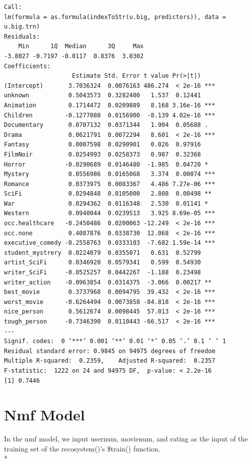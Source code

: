 \documentclass[11pt]{article}
\newcommand\tab[1][0.5cm]{\hspace*{#1}}
\begin{document}
\begin{verbatim}
Call:
lm(formula = as.formula(indexToStr(u.big, predictors)), data = u.big.trn)
Residuals:
    Min      1Q  Median      3Q     Max 
-3.8027 -0.7197 -0.0117  0.8376  3.0302 
Coefficients:
                   Estimate Std. Error t value Pr(>|t|)    
(Intercept)       3.7036324  0.0076163 486.274  < 2e-16 ***
unknown           0.5043573  0.3282400   1.537  0.12441    
Animation         0.1714472  0.0209889   8.168 3.16e-16 ***
Children         -0.1277080  0.0156900  -8.139 4.02e-16 ***
Documentary       0.0707132  0.0371344   1.904  0.05688 .  
Drama             0.0621791  0.0072294   8.601  < 2e-16 ***
Fantasy           0.0007598  0.0290901   0.026  0.97916    
FilmNoir          0.0254993  0.0258373   0.987  0.32368    
Horror           -0.0290689  0.0146480  -1.985  0.04720 *  
Mystery           0.0556986  0.0165068   3.374  0.00074 ***
Romance           0.0373975  0.0083367   4.486 7.27e-06 ***
SciFi             0.0294848  0.0105000   2.808  0.00498 ** 
War               0.0294362  0.0116348   2.530  0.01141 *  
Western           0.0940044  0.0239513   3.925 8.69e-05 ***
occ.healthcare   -0.2450486  0.0200063 -12.249  < 2e-16 ***
occ.none          0.4087876  0.0338730  12.068  < 2e-16 ***
executive_comedy -0.2558763  0.0333103  -7.682 1.59e-14 ***
student_mystrery  0.0224079  0.0355071   0.631  0.52799    
artist_SciFi      0.0346920  0.0579341   0.599  0.54930    
writer_SciFi     -0.0525257  0.0442267  -1.188  0.23498    
writer_action    -0.0963854  0.0314375  -3.066  0.00217 ** 
best_movie        0.3737968  0.0094795  39.432  < 2e-16 ***
worst_movie      -0.6264494  0.0073858 -84.818  < 2e-16 ***
nice_person       0.5612674  0.0098445  57.013  < 2e-16 ***
tough_person     -0.7346390  0.0110443 -66.517  < 2e-16 ***
---
Signif. codes:  0 ‘***’ 0.001 ‘**’ 0.01 ‘*’ 0.05 ‘.’ 0.1 ‘ ’ 1
Residual standard error: 0.9845 on 94975 degrees of freedom
Multiple R-squared:  0.2359,	Adjusted R-squared:  0.2357 
F-statistic:  1222 on 24 and 94975 DF,  p-value: < 2.2e-16
[1] 0.7446
\end{verbatim}

\section{Nmf Model}
\tab{}In the nmf model, we input usernum, movienum, and rating as the input of the training set of the recosystem()'s \$train() function.
\\*
\end{document}
